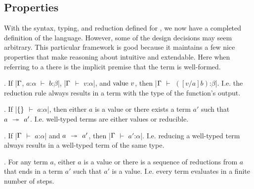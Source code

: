 \newpage
\subsection{Properties}
With the syntax, typing, and reduction defined for \LangA,
we now have a completed definition of the language.
However, some of the design decisions may seem arbitrary.
This particular framework is good because it maintains a few nice properties that make reasoning about \LangA intuitive and extendable.
Here when referring to a  there is the implicit premise that the term is well-formed.

\begin{theorem}
  .
  If
    \code|$\Gamma$, $a$:$α$ $⊢$ $b$:$β$|,
    \code|$\Gamma$ $⊢$ $v$:$α$|, and
    $\mathrm{value}~v$,
  then
    \code|$\Gamma$ $⊢$ $([v/a]b)$:$β$|.
  I.e. the  reduction rule always results in a term with the type of the function's output.
\end{theorem}

\begin{theorem}
  .
  If
    \code|$\left\{  \right\}$ $⊢$ $a$:$α$|,
  then
    either $a$ is a value or
    there exists a term $a'$ such that $a \hspace{0.4em}\twoheadrightarrow\hspace{0.4em} a'$.
  I.e. well-typed terms are either values or reducible.
\end{theorem}

\begin{theorem}
  .
  If
    \code|$\Gamma$ $⊢$ $a$:$α$| and $a \hspace{0.4em}\twoheadrightarrow\hspace{0.4em} a'$,
  then
    \code|$\Gamma$ $⊢$ $a'$:$α$|.
  I.e. reducing a well-typed term always results in a well-typed term of the same type.
\end{theorem}

%
%
%

\begin{theorem}
  .
  For any term $a$,
  either
    $a$ is a value
  or
    there is a sequence of reductions from $a$ that ends in a term $a'$ such that $a'$ is a value.
  I.e. every term evaluates in a finite number of steps.
\end{theorem}
